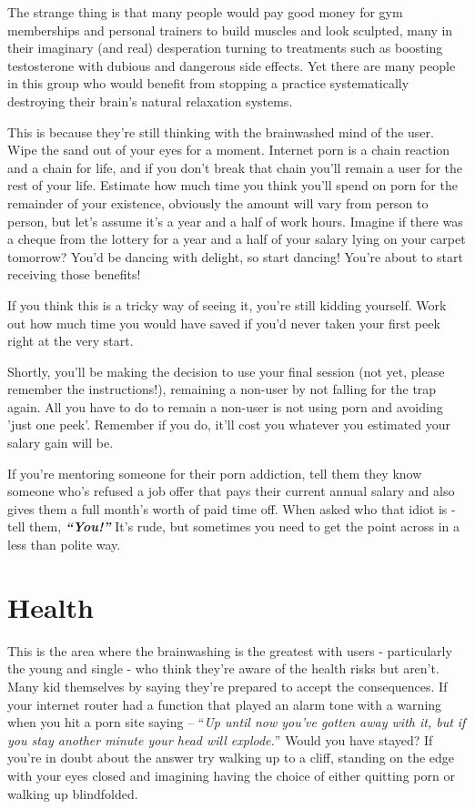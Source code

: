 \documentclass[
]{book}
\begin{document}
The strange thing is that many people would pay good money for gym memberships and personal trainers to build muscles and look sculpted, many in their imaginary (and real) desperation turning to treatments such as boosting testosterone with dubious and dangerous side effects. Yet there are many people in this group who would benefit from stopping a practice systematically destroying their brain's natural relaxation systems.

This is because they're still thinking with the brainwashed mind of the user. Wipe the sand out of your eyes for a moment. Internet porn is a chain reaction and a chain for life, and if you don't break that chain you'll remain a user for the rest of your life. Estimate how much time you think you'll spend on porn for the remainder of your existence, obviously the amount will vary from person to person, but let's assume it's a year and a half of work hours. Imagine if there was a cheque from the lottery for a year and a half of your salary lying on your carpet tomorrow? You'd be dancing with delight, so start dancing! You're about to start receiving those benefits!

If you think this is a tricky way of seeing it, you're still kidding yourself. Work out how much time you would have saved if you'd never taken your first peek right at the very start.

Shortly, you'll be making the decision to use your final session (not yet, please remember the instructions!), remaining a non-user by not falling for the trap again. All you have to do to remain a non-user is not using porn and avoiding 'just one peek'. Remember if you do, it'll cost you whatever you estimated your salary gain will be.

If you're mentoring someone for their porn addiction, tell them they know someone who's refused a job offer that pays their current annual salary and also gives them a full month's worth of paid time off. When asked who that idiot is - tell them, \textbf{\emph{``You!''}} It's rude, but sometimes you need to get the point across in a less than polite way.

\hypertarget{health}{%
\chapter{Health}\label{health}}

This is the area where the brainwashing is the greatest with users - particularly the young and single - who think they're aware of the health risks but aren't. Many kid themselves by saying they're prepared to accept the consequences. If your internet router had a function that played an alarm tone with a warning when you hit a porn site saying -- ``\emph{Up until now you've gotten away with it, but if you stay another minute your head will explode.}'' Would you have stayed? If you're in doubt about the answer try walking up to a cliff, standing on the edge with your eyes closed and imagining having the choice of either quitting porn or walking up blindfolded.
\end{document}
